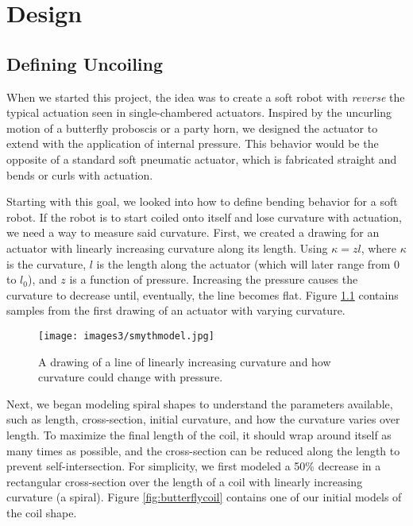 \chapter{Design}

\section{Defining Uncoiling}

When we started this project, the idea was to create a soft robot with \emph{reverse} the typical actuation seen in single-chambered actuators. Inspired by the uncurling motion of a butterfly proboscis or a party horn, we designed the actuator to extend with the application of internal pressure. This behavior would be the opposite of a standard soft pneumatic actuator, which is fabricated straight and bends or curls with actuation. 

Starting with this goal, we looked into how to define bending behavior for a soft robot. If the robot is to start coiled onto itself and lose curvature with actuation, we need a way to measure said curvature. First, we created a drawing for an actuator with linearly increasing curvature along its length. Using $\kappa = zl$, where $\kappa$ is the curvature, $l$ is the length along the actuator (which will later range from 0 to $l_0$), and $z$ is a function of pressure. Increasing the pressure causes the curvature to decrease until, eventually, the line becomes flat. Figure \ref{fig:smythmodel} contains samples from the first drawing of an actuator with varying curvature. 

\begin{figure}[ht]
    \centering
    \texttt{[image: images3/smythmodel.jpg]}
    \caption{A drawing of a line of linearly increasing curvature and how curvature could change with pressure.}
    \label{fig:smythmodel}
\end{figure}

Next, we began modeling spiral shapes to understand the parameters available, such as length, cross-section, initial curvature, and how the curvature varies over length. To maximize the final length of the coil, it should wrap around itself as many times as possible, and the cross-section can be reduced along the length to prevent self-intersection. For simplicity, we first modeled a 50\% decrease in a rectangular cross-section over the length of a coil with linearly increasing curvature (a spiral). Figure \ref{fig:butterflycoil} contains one of our initial models of the coil shape. 

